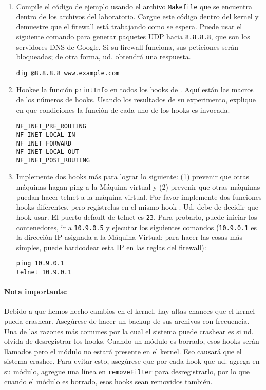 \begin{enumerate}
	
\item Compile el código de ejemplo usando el archivo \texttt{Makefile} que se encuentra dentro de los archivos del laboratorio.
	Cargue este código dentro del kernel y demuestre que el firewall está trabajando como se espera. Puede usar el siguiente comando para generar paquetes UDP hacia \texttt{8.8.8.8}, que son los servidores DNS de Google. Si su firewall funciona, sus peticiones serán bloqueadas; de otra forma, ud. obtendrá una respuesta.

\begin{lstlisting}
dig @8.8.8.8 www.example.com 
\end{lstlisting}
 
\item Hookee la función \texttt{printInfo} en todos los hooks de \netfilter. Aquí están las macros de los números de hooks. 
Usando los resultados de su experimento, explique en que condiciones la función de cada uno de los hooks es invocada.

\begin{lstlisting}
NF_INET_PRE_ROUTING 
NF_INET_LOCAL_IN        
NF_INET_FORWARD 
NF_INET_LOCAL_OUT 
NF_INET_POST_ROUTING    
\end{lstlisting}


\item Implemente dos hooks más para lograr lo siguiente:
(1) prevenir que otras máquinas hagan ping a la Máquina virtual y (2) prevenir que otras máquinas puedan hacer telnet a la máquina virtual.
Por favor implemente dos funciones hooks diferentes, pero registrelas en el mismo hook \netfilter. Ud. debe de decidir que hook usar.
El puerto default de telnet es \texttt{23}. Para probarlo, puede iniciar los contenedores, ir a \texttt{10.9.0.5} y ejecutar los siguientes comandos (\texttt{10.9.0.1} es la dirección IP asignada a la Máquina Virtual; para hacer las cosas más simples, puede hardcodear esta IP en las reglas del firewall):

 
\begin{lstlisting}
ping 10.9.0.1
telnet 10.9.0.1
\end{lstlisting}
     
\end{enumerate}
 

\paragraph{Nota importante:} Debido a que hemos hecho cambios en el kernel, hay altas chances que el kernel pueda crashear. Asegúrese de hacer un backup de sus archivos con frecuencia. Una de las razones más comunes por la cual el sistema puede crashear es si ud. olvida de desregistrar los hooks. Cuando un módulo es borrado, esos hooks serán llamados pero el módulo no estará presente en el kernel. Eso causará que el sistema crashee.
Para evitar esto, asegúrese que por cada hook que ud. agrega en su módulo, agregue una línea en \texttt{removeFilter} para desregistrarlo, por lo que cuando el módulo es borrado, esos hooks sean removidos también.


